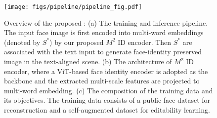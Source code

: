 \begin{figure}[tb]
  \centering
  \texttt{[image: figs/pipeline/pipeline\_fig.pdf]}
  \caption{Overview of the proposed \ours: (a) The training and inference pipeline. The input face image is first encoded into multi-word embeddings (denoted by $S^*$) by our proposed $M^2$ ID encoder. Then $S^*$ are associated with the text input to generate face-identity preserved image in the text-aligned scene. (b) The architecture of $M^2$ ID encoder, where a ViT-based face identity encoder is adopted as the backbone and the extracted multi-scale features are projected to multi-word embedding. (c) The composition of the training data and its objectives. The training data consists of a public face dataset for reconstruction and a self-augmented dataset for  editability learning. }
  \label{fig:pipeline} 
\end{figure}